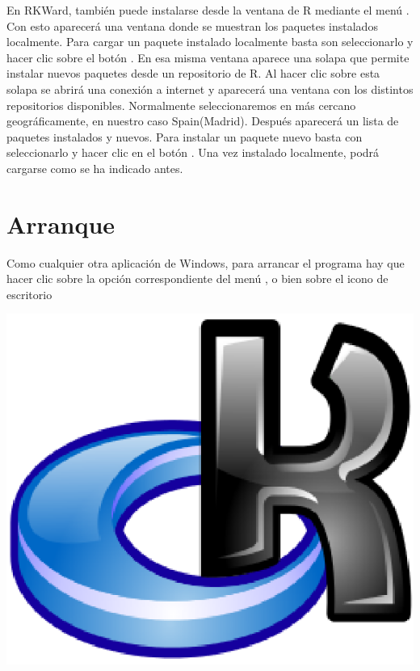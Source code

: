 En RKWard, también puede instalarse desde la ventana de R mediante el menú .
Con esto aparecerá una ventana donde se muestran los paquetes instalados localmente.
Para cargar un paquete instalado localmente basta son seleccionarlo y hacer clic sobre el botón .
En esa misma ventana aparece una solapa  que permite instalar nuevos paquetes desde un
repositorio de R.
Al hacer clic sobre esta solapa se abrirá una conexión a internet y aparecerá una ventana con los distintos
repositorios disponibles. Normalmente seleccionaremos en más cercano geográficamente, en nuestro caso Spain(Madrid).
Después aparecerá un lista de paquetes instalados y nuevos.
Para instalar un paquete nuevo basta con seleccionarlo y hacer clic en el botón .
Una vez instalado localmente, podrá cargarse como se ha indicado antes.


\section{Arranque}
Como cualquier otra aplicación de Windows, para arrancar el programa hay que hacer clic sobre la opción
correspondiente del menú , o bien sobre el icono de escritorio
\begin{center}
  \includegraphics[scale=0.3]{capitulos/introduccion/img/icono_rkward}
\end{center}

\begin{figure}[]
  \centering
  
  \caption{}
  \label{}
\end{figure}

